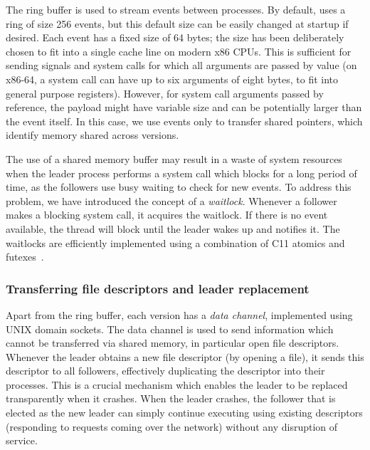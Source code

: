 The ring buffer is used to stream events between processes.  By
default, \varan uses a ring of size 256 events, but this default
size can be easily changed at startup if desired.  Each event has a
fixed size of 64 bytes; the size has been deliberately chosen to fit
into a single cache line on modern x86 CPUs.  This is sufficient for
sending signals and system calls for which all arguments are passed by
value (on x86-64, a system call can have up to six arguments of eight
bytes, to fit into general purpose registers).  However, for system
call arguments passed by reference, the payload might have variable
size and can be potentially larger than the event itself.  In this
case, we use events only to transfer shared pointers, which identify
memory shared across versions.

The use of a shared memory buffer may result in a waste of system
resources when the leader process performs a system call which blocks
for a long period of time, as the followers use busy waiting to check
for new events. To address this problem, we have introduced the
concept of a \emph{waitlock}. Whenever a follower makes a blocking
system call, it acquires the waitlock. If there is no event available,
the thread will block until the leader wakes up and notifies it. The
waitlocks are efficiently implemented using a combination of C11
atomics and futexes~\cite{futex}.

\subsubsection{Transferring file descriptors and leader replacement}
\label{sec:leader-repl}

Apart from the ring buffer, each version has a \emph{data channel},
implemented using UNIX domain sockets.
The data channel is used to send information which cannot be
transferred via shared memory, in particular open file descriptors.
Whenever the leader obtains a new file descriptor (\eg by opening a
file), it sends this descriptor to all followers, effectively
duplicating the descriptor into their processes. This is a crucial
mechanism which enables the leader to be replaced transparently when
it crashes. When the leader crashes, the follower that is elected as
the new leader can simply continue executing using existing
descriptors (\eg responding to requests coming over the network)
without any disruption of service.

